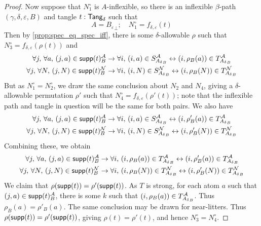 \begin{proof}
  Now suppose that \( N_1^\circ \) is \( A \)-inflexible, so there is an inflexible \( \beta \)-path \( (\gamma,\delta,\varepsilon,B) \) and tangle \( t : \mathsf{Tang}_\delta \) such that
  \[ A = {B_\varepsilon}_\bot;\quad N_1^\circ = f_{\delta,\varepsilon}(t) \]
  Then by \cref{prop:spec_eq_spec_iff}, there is some \( \delta \)-allowable \( \rho \) such that \( N_3^\circ = f_{\delta,\varepsilon}(\rho(t)) \) and
  \begin{align*}
    \forall j,\, \forall a,\, (j, a) \in \operatorname{\mathsf{supp}}(t)_B^{\mathcal A} &\to \forall i,\, (i, a) \in S_{{A_\delta}_B}^{\mathcal A} \leftrightarrow (i, \rho_B(a)) \in T_{{A_\delta}_B}^{\mathcal A} \\
    \forall j,\, \forall N,\, (j, N) \in \operatorname{\mathsf{supp}}(t)_B^{\mathcal N} &\to \forall i,\, (i, N) \in S_{{A_\delta}_B}^{\mathcal N} \leftrightarrow (i, \rho_B(N)) \in T_{{A_\delta}_B}^{\mathcal N}
  \end{align*}
  But as \( N_1^\circ = N_2^\circ \), we draw the same conclusion about \( N_2 \) and \( N_4 \), giving a \( \delta \)-allowable permutation \( \rho' \) such that \( N_4^\circ = f_{\delta,\varepsilon}(\rho'(t)) \); note that the inflexible path and tangle in question will be the same for both pairs.
  We also have
  \begin{align*}
    \forall j,\, \forall a,\, (j, a) \in \operatorname{\mathsf{supp}}(t)_B^{\mathcal A} &\to \forall i,\, (i, a) \in S_{{A_\delta}_B}^{\mathcal A} \leftrightarrow (i, \rho'_B(a)) \in T_{{A_\delta}_B}^{\mathcal A} \\
    \forall j,\, \forall N,\, (j, N) \in \operatorname{\mathsf{supp}}(t)_B^{\mathcal N} &\to \forall i,\, (i, N) \in S_{{A_\delta}_B}^{\mathcal N} \leftrightarrow (i, \rho'_B(N)) \in T_{{A_\delta}_B}^{\mathcal N}
  \end{align*}
  Combining these, we obtain
  \begin{align*}
    \forall j,\, \forall a,\, (j, a) \in \operatorname{\mathsf{supp}}(t)_B^{\mathcal A} &\to \forall i,\, (i, \rho_B(a)) \in T_{{A_\delta}_B}^{\mathcal A} \leftrightarrow (i, \rho'_B(a)) \in T_{{A_\delta}_B}^{\mathcal A} \\
    \forall j,\, \forall N,\, (j, N) \in \operatorname{\mathsf{supp}}(t)_B^{\mathcal N} &\to \forall i,\, (i, \rho_B(N)) \in T_{{A_\delta}_B}^{\mathcal N} \leftrightarrow (i, \rho'_B(N)) \in T_{{A_\delta}_B}^{\mathcal N}
  \end{align*}
  We claim that \( \rho(\operatorname{\mathsf{supp}}(t)) = \rho'(\operatorname{\mathsf{supp}}(t)) \).
  As \( T \) is strong, for each atom \( a \) such that \( (j, a) \in \operatorname{\mathsf{supp}}(t)_B^{\mathcal A} \), there is some \( k \) such that \( (i, \rho_B(a)) \in T_{{A_\delta}_B}^{\mathcal A} \).
  Thus \( \rho_B(a) = \rho'_B(a) \).
  The same conclusion may be drawn for near-litters.
  Thus \( \rho(\operatorname{\mathsf{supp}}(t)) = \rho'(\operatorname{\mathsf{supp}}(t)) \), giving \( \rho(t) = \rho'(t) \), and hence \( N_3^\circ = N_4^\circ \).
\end{proof}
